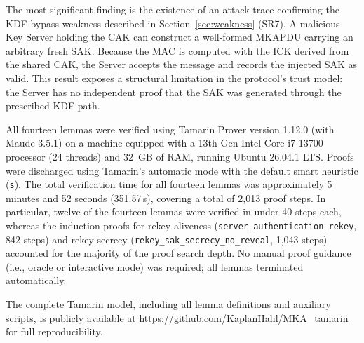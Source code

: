 The most significant finding is the existence of an attack trace confirming the KDF-bypass weakness described in Section~\ref{sec:weakness} (SR7). A malicious Key Server holding the CAK can construct a well-formed MKAPDU carrying an arbitrary fresh SAK. Because the MAC is computed with the ICK derived from the shared CAK, the Server accepts the message and records the injected SAK as valid. This result exposes a structural limitation in the protocol's trust model: the Server has no independent proof that the SAK was generated through the prescribed KDF path.

All fourteen lemmas were verified using Tamarin Prover version 1.12.0 (with Maude 3.5.1) on a machine equipped with a 13th Gen Intel Core i7-13700 processor (24 threads) and 32~GB of RAM, running Ubuntu 26.04.1 LTS. Proofs were discharged using Tamarin's automatic mode with the default smart heuristic (\texttt{s}). The total verification time for all fourteen lemmas was approximately 5 minutes and 52 seconds (351.57\,s), covering a total of 2,013 proof steps. In particular, twelve of the fourteen lemmas were verified in under 40 steps each, whereas the induction proofs for rekey aliveness (\texttt{server\_authentication\_rekey}, 842 steps) and rekey secrecy (\texttt{rekey\_sak\_secrecy\_no\_reveal}, 1,043 steps) accounted for the majority of the proof search depth. No manual proof guidance (i.e., oracle or interactive mode) was required; all lemmas terminated automatically.

The complete Tamarin model, including all lemma definitions and auxiliary scripts, is publicly available at \url{https://github.com/KaplanHalil/MKA_tamarin} for full reproducibility.

